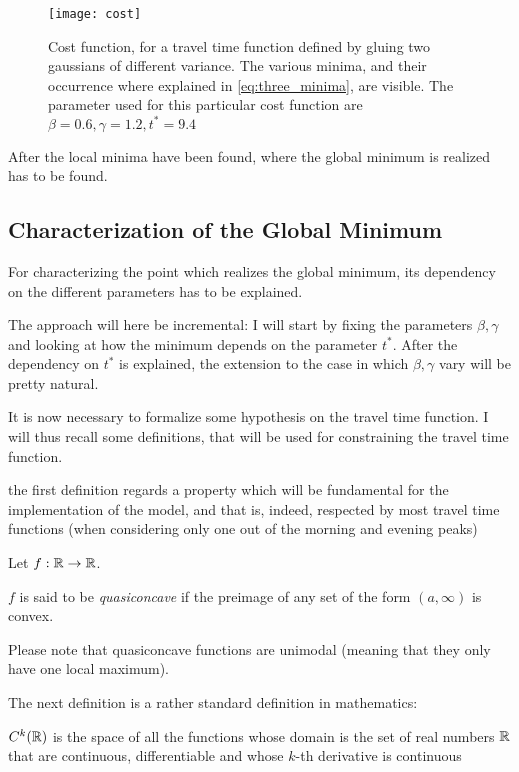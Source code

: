 \begin{figure}
  \centering
  \texttt{[image: cost]}
  \caption{Cost function, for a travel time function defined by gluing two gaussians of different variance.
    The various minima, and their occurrence where explained in \eqref{eq:three_minima},
    are visible.
  The parameter used for this particular cost function are \(\beta = 0.6, \gamma = 1.2, t^* = 9.4\)}
  \label{fig:cost}
\end{figure}

After the local minima have been found,
where the global minimum is realized has to be found.

\subsection{Characterization of the Global Minimum}
\label{sec:glob_min}

For characterizing the point which realizes the global minimum,
its dependency on the different parameters has to be explained.

The approach will here be incremental:
I will start by fixing the parameters \(\beta, \gamma\) and looking at how the minimum depends on the parameter \(t^*\).
After the dependency on \(t^*\) is explained, the extension to the case in which \(\beta, \gamma\) vary will be pretty natural.

It is now necessary to formalize some hypothesis on the travel time function.
I will thus recall some definitions, that will be used for constraining the travel time function.

the first definition regards a property which will be fundamental for the implementation of the model,
and that is, indeed, respected by most travel time functions (when considering only one out of the morning and evening peaks)
\begin{definition}
  Let \(f:\mathbb{R} \rightarrow \mathbb{R}\).
  
  \(f\) is said to be \textit{quasiconcave} if the preimage of any set of the form \((a, \infty)\) is convex.
\end{definition}

Please note that quasiconcave functions are unimodal (meaning that they only have one local maximum).

The next definition is a rather standard definition in mathematics:
\begin{definition}
  \(C^k(\mathbb{R})\) is the space of all the functions whose domain is the set of real numbers \(\mathbb{R}\) that are continuous, differentiable and whose \(k\)-th derivative is continuous
\end{definition}

